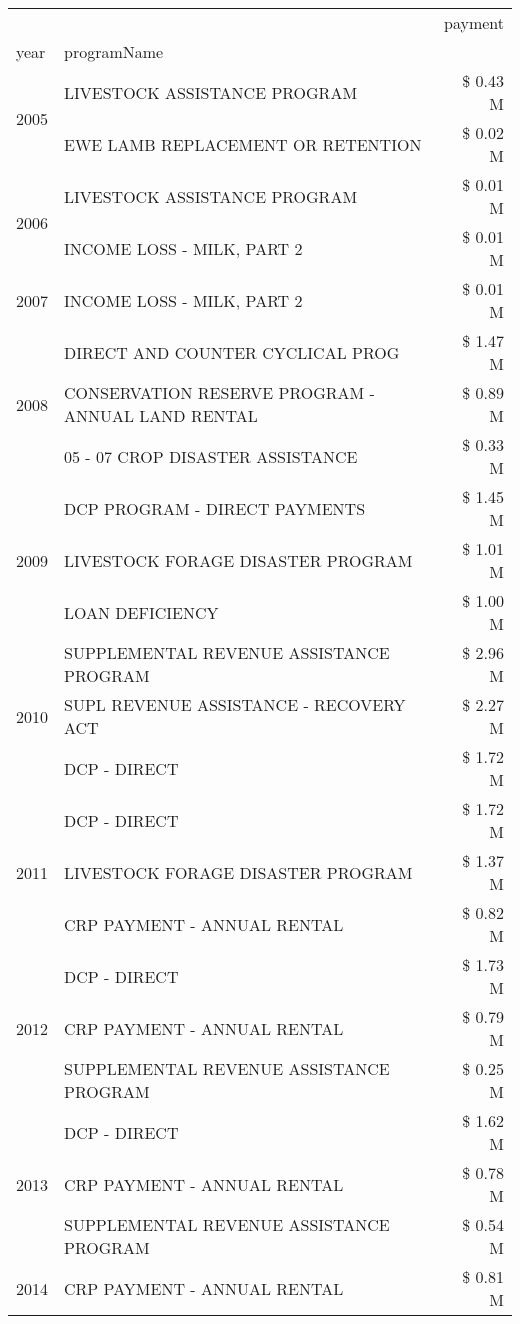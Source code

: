 \begin{tabular}{llr}
\toprule
 &  & payment \\
year & programName &  \\
\midrule
\multirow[t]{2}{*}{2005} & LIVESTOCK ASSISTANCE PROGRAM & \$ 0.43 M \\
 & EWE LAMB REPLACEMENT OR RETENTION & \$ 0.02 M \\
\cline{1-3}
\multirow[t]{2}{*}{2006} & LIVESTOCK ASSISTANCE PROGRAM & \$ 0.01 M \\
 & INCOME LOSS - MILK, PART 2 & \$ 0.01 M \\
\cline{1-3}
2007 & INCOME LOSS - MILK, PART 2 & \$ 0.01 M \\
\cline{1-3}
\multirow[t]{3}{*}{2008} & DIRECT AND COUNTER CYCLICAL PROG & \$ 1.47 M \\
 & CONSERVATION RESERVE PROGRAM - ANNUAL LAND RENTAL & \$ 0.89 M \\
 & 05 - 07 CROP DISASTER ASSISTANCE & \$ 0.33 M \\
\cline{1-3}
\multirow[t]{3}{*}{2009} & DCP PROGRAM - DIRECT PAYMENTS & \$ 1.45 M \\
 & LIVESTOCK FORAGE DISASTER  PROGRAM & \$ 1.01 M \\
 & LOAN DEFICIENCY & \$ 1.00 M \\
\cline{1-3}
\multirow[t]{3}{*}{2010} & SUPPLEMENTAL REVENUE ASSISTANCE PROGRAM & \$ 2.96 M \\
 & SUPL REVENUE ASSISTANCE - RECOVERY ACT & \$ 2.27 M \\
 & DCP - DIRECT & \$ 1.72 M \\
\cline{1-3}
\multirow[t]{3}{*}{2011} & DCP - DIRECT & \$ 1.72 M \\
 & LIVESTOCK FORAGE DISASTER PROGRAM & \$ 1.37 M \\
 & CRP PAYMENT - ANNUAL RENTAL & \$ 0.82 M \\
\cline{1-3}
\multirow[t]{3}{*}{2012} & DCP - DIRECT & \$ 1.73 M \\
 & CRP PAYMENT - ANNUAL RENTAL & \$ 0.79 M \\
 & SUPPLEMENTAL REVENUE ASSISTANCE PROGRAM & \$ 0.25 M \\
\cline{1-3}
\multirow[t]{3}{*}{2013} & DCP - DIRECT & \$ 1.62 M \\
 & CRP PAYMENT - ANNUAL RENTAL & \$ 0.78 M \\
 & SUPPLEMENTAL REVENUE ASSISTANCE PROGRAM & \$ 0.54 M \\
\cline{1-3}
\multirow[t]{3}{*}{2014} & CRP PAYMENT - ANNUAL RENTAL & \$ 0.81 M \\

\end{tabular}
